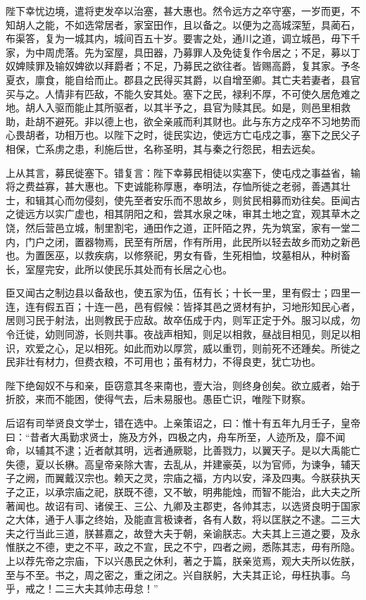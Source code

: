 \documentclass[12pt,UTF8]{ctexbook}
\begin{document}
陛下幸忧边境，遣将吏发卒以治塞，甚大惠也。然令远方之卒守塞，一岁而更，不知胡人之能，不如选常居者，家室田作，且以备之。以便为之高城深堑，具蔺石，布渠答，复为一城其内，城间百五十岁。要害之处，通川之道，调立城邑，毋下千家，为中周虎落。先为室屋，具田器，乃募罪人及免徒复作令居之；不足，募以丁奴婢赎罪及输奴婢欲以拜爵者；不足，乃募民之欲往者。皆赐高爵，复其家。予冬夏衣，廪食，能自给而止。郡县之民得买其爵，以自增至卿。其亡夫若妻者，县官买与之。人情非有匹敌，不能久安其处。塞下之民，禄利不厚，不可使久居危难之地。胡人入驱而能止其所驱者，以其半予之，县官为赎其民。如是，则邑里相救助，赴胡不避死。非以德上也，欲全亲戚而利其财也。此与东方之戍卒不习地势而心畏胡者，功相万也。以陛下之时，徙民实边，使远方亡屯戍之事，塞下之民父子相保，亡系虏之患，利施后世，名称圣明，其与秦之行怨民，相去远矣。



上从其言，募民徙塞下。错复言：陛下幸募民相徒以实塞下，使屯戍之事益省，输将之费益寡，甚大惠也。下吏诚能称厚惠，奉明法，存恤所徙之老弱，善遇其壮士，和辑其心而勿侵刻，使先至者安乐而不思故乡，则贫民相募而劝往矣。臣闻古之徙远方以实广虚也，相其阴阳之和，尝其水泉之味，审其土地之宜，观其草木之饶，然后营邑立城，制里割宅，通田作之道，正阡陌之界，先为筑室，家有一堂二内，门户之闭，置器物焉，民至有所居，作有所用，此民所以轻去故乡而劝之新邑也。为置医巫，以救疾病，以修祭祀，男女有昏，生死相恤，坟墓相从，种树畜长，室屋完安，此所以使民乐其处而有长居之心也。



臣又闻古之制边县以备敌也，使五家为伍，伍有长；十长一里，里有假士；四里一连，连有假五百；十连一邑，邑有假候：皆择其邑之贤材有护，习地形知民心者，居则习民于射法，出则教民于应敌。故卒伍成于内，则军正定于外。服习以成，勿令迁徙，幼则同游，长则共事。夜战声相知，则足以相救，昼战目相见，则足以相识，欢爱之心，足以相死。如此而劝以厚赏，威以重罚，则前死不还踵矣。所徙之民非壮有材力，但费衣粮，不可用也；虽有材力，不得良吏，犹亡功也。



陛下绝匈奴不与和亲，臣窃意其冬来南也，壹大治，则终身创矣。欲立威者，始于折胶，来而不能困，使得气去，后未易服也。愚臣亡识，唯陛下财察。



后诏有司举贤良文学士，错在选中。上亲策诏之，曰：惟十有五年九月壬子，皇帝曰：“昔者大禹勤求贤士，施及方外，四极之内，舟车所至，人迹所及，靡不闻命，以辅其不逮；近者献其明，远者通厥聪，比善戮力，以翼天子。是以大禹能亡失德，夏以长楙。高皇帝亲除大害，去乱从，并建豪英，以为官师，为谏争，辅天子之阙，而翼戴汉宗也。赖天之灵，宗庙之福，方内以安，泽及四夷。今朕获执天子之正，以承宗庙之祀，朕既不德，又不敏，明弗能烛，而智不能治，此大夫之所著闻也。故诏有司、诸侯王、三公、九卿及主郡吏，各帅其志，以选贤良明于国家之大体，通于人事之终始，及能直言极谏者，各有人数，将以匡朕之不逮。二三大夫之行当此三道，朕甚嘉之，故登大夫于朝，亲谕朕志。大夫其上三道之要，及永惟朕之不德，吏之不平，政之不宣，民之不宁，四者之阙，悉陈其志，毋有所隐。上以荐先帝之宗庙，下以兴愚民之休利，著之于篇，朕亲览焉，观大夫所以佐朕，至与不至。书之，周之密之，重之闭之。兴自朕躬，大夫其正论，毋枉执事。乌乎，戒之！二三大夫其帅志毋怠！”
\end{document}

